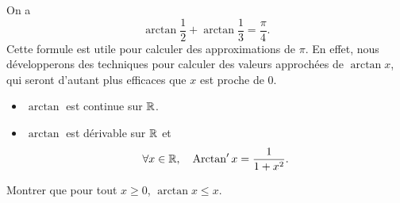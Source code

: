 \documentclass{magnoliaold}
\begin{document}
\begin{remarqueUnique}
\remarque On a
\[\arctan\frac{1}{2}+\arctan\frac{1}{3}=\frac{\pi}{4}.\]
Cette formule est utile pour calculer des approximations de $\pi$. En effet,
nous développerons des techniques pour calculer des valeurs approchées de
$\arctan x$, qui seront d'autant plus efficaces que $x$ est proche de 0.
\end{remarqueUnique}


\begin{proposition}[utile=-3]
\begin{itemize}
\item $\arctan$ est continue sur $\mathbb{R}$.
\item $\arctan$ est dérivable sur $\mathbb{R}$ et
  \[\forall x\in\mathbb{R} ,\quad \operatorname{Arctan}' x=\frac{1}{1+x^2}.\]
\end{itemize}
\end{proposition}

\begin{exoUnique}
\exo Montrer que pour tout $x\geq 0$, $\arctan x\leq x$.
  
\end{exoUnique}
\end{document}
